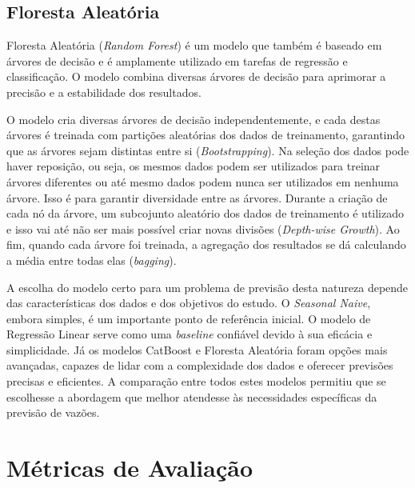 
\subsection{Floresta Aleatória}

Floresta Aleatória (\textit{Random Forest}) é um modelo que também é baseado em árvores de decisão e é amplamente utilizado em tarefas de regressão e classificação. O modelo combina diversas árvores de decisão para aprimorar a precisão e a estabilidade dos resultados.

O modelo cria diversas árvores de decisão independentemente, e cada destas árvores é treinada com partições aleatórias dos dados de treinamento, garantindo que as árvores sejam distintas entre si (\textit{Bootstrapping}). Na seleção dos dados pode haver reposição, ou seja, os mesmos dados podem ser utilizados para treinar árvores diferentes ou até mesmo dados podem nunca ser utilizados em nenhuma árvore. Isso é para garantir diversidade entre as árvores. Durante a criação de cada nó da árvore, um subcojunto aleatório dos dados de treinamento é utilizado e isso vai até não ser mais possível criar novas divisões (\textit{Depth-wise Growth}). Ao fim, quando cada árvore foi treinada, a agregação dos resultados se dá calculando a média entre todas elas (\textit{bagging}).\cite{hasan_ahmed_salman_2024}\cite{sklearn_random_forest_2024}

A escolha do modelo certo para um problema de previsão desta natureza depende das características dos dados e dos objetivos do estudo. O \textit{Seasonal Naive}, embora simples, é um importante ponto de referência inicial. O modelo de Regressão Linear serve como uma \textit{baseline} confiável devido à sua eficácia e simplicidade. Já os modelos CatBoost e Floresta Aleatória foram opções mais avançadas, capazes de lidar com a complexidade dos dados e oferecer previsões precisas e eficientes. A comparação entre todos estes modelos permitiu que se escolhesse a abordagem que melhor atendesse às necessidades específicas da previsão de vazões.

\section{Métricas de Avaliação}

